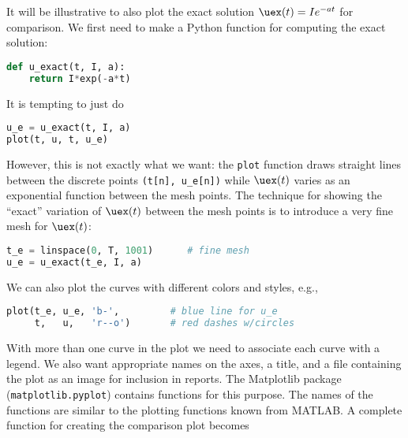 \documentclass[graybox,sectrefs,envcountresetchap,open=right,final]{svmonodo}
\begin{document}
It will be illustrative to also plot the exact solution
$\uex(t)=Ie^{-at}$ for comparison. We first
need to make a Python function for computing the exact solution:




\begin{lstlisting}[language=python,style=blue1_bluegreen]
def u_exact(t, I, a):
    return I*exp(-a*t)

\end{lstlisting}

It is tempting to just do




\begin{lstlisting}[language=python,style=blue1_bluegreen]
u_e = u_exact(t, I, a)
plot(t, u, t, u_e)

\end{lstlisting}

However, this is not exactly what we want: the \texttt{plot} function draws
straight lines between the discrete points \Verb!(t[n], u_e[n])! while
$\uex(t)$ varies as an exponential function between the mesh points.
The technique for showing the ``exact'' variation of $\uex(t)$ between
the mesh points is to introduce a very fine mesh for $\uex(t)$:




\begin{lstlisting}[language=python,style=blue1_bluegreen]
t_e = linspace(0, T, 1001)      # fine mesh
u_e = u_exact(t_e, I, a)

\end{lstlisting}

We can also plot the curves with different colors and styles, e.g.,




\begin{lstlisting}[language=python,style=blue1_bluegreen]
plot(t_e, u_e, 'b-',         # blue line for u_e
     t,   u,   'r--o')       # red dashes w/circles

\end{lstlisting}


With more than one curve in the plot we need to associate each curve
with a legend. We also want appropriate names on the axes, a title,
and a file containing the plot as an image for inclusion in reports.
The Matplotlib package (\texttt{matplotlib.pyplot}) contains functions for
this purpose. The names of the functions are similar to the plotting
functions known from MATLAB.  A complete function for creating
the comparison plot becomes
\end{document}
